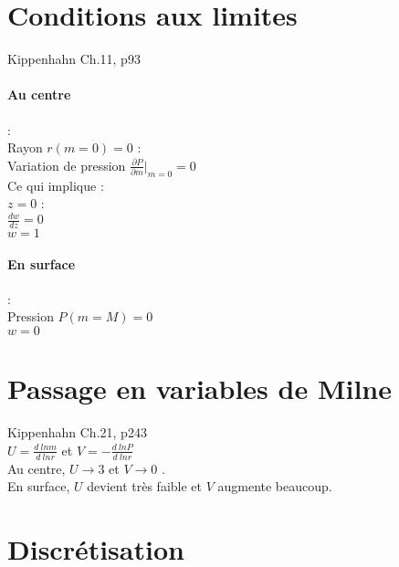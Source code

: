 \documentclass[a4paper,10pt]{article}
\begin{document}
\section{Conditions aux limites}
Kippenhahn Ch.11, p93
\paragraph{Au centre}: \\
Rayon $r(m=0)=0$ : \\
Variation de pression $\frac{\partial P}{\partial m}\vert_{m=0} = 0$\\
Ce qui implique :\\
$z=0$ :\\
$\frac{dw}{dz}=0$\\
$w=1$

\paragraph{En surface}: \\
Pression $P(m=M)=0$\\

$w=0$

\section{Passage en variables de Milne}
Kippenhahn Ch.21, p243\\
$U=\frac{d~ln m}{d~ln r} $ et $V=-\frac{d~ln P}{d~lnr}$\\
Au centre, $U \rightarrow 3$ et $V \rightarrow 0$ .\\
En surface, $U$ devient très faible et $V$ augmente beaucoup.

\section{Discrétisation}
%
%
\end{document}
